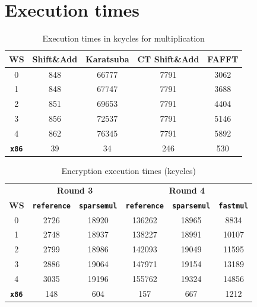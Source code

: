 \chapter{Execution times}

\begin{table}[H]
    \centering
    \caption{Execution times in kcycles for multiplication}
    \begin{tabular}{c|cccc}
        \toprule
        \textbf{WS}  & \textbf{Shift\&Add} & \textbf{Karatsuba} & \textbf{CT Shift\&Add} & \textbf{FAFFT} \\
        \midrule
        0 & 848 & 66777 & 7791 & 3062 \\
        1 & 848 & 67747 & 7791 & 3688 \\
        2 & 851 & 69653 & 7791 & 4404 \\
        3 & 856 & 72537 & 7791 & 5146 \\
        4 & 862 & 76345 & 7791 & 5892 \\
        \midrule
        \textbf{\texttt{x86}} & 39  &  34  &  246  &  530 \\
        \bottomrule
    \end{tabular}
    \label{tab:multTiming}
\end{table}

\begin{table}[H]
    \centering
    \caption{Encryption execution times (kcycles)}
    \begin{tabular}{c|cc|ccc}
        \toprule
        & \multicolumn{2}{c|}{\textbf{Round 3}} & \multicolumn{3}{c}{\textbf{Round 4}} \\
        \textbf{WS} & \texttt{\textbf{reference}} & \texttt{\textbf{sparsemul}} & \texttt{\textbf{reference}} & \texttt{\textbf{sparsemul}} & \texttt{\textbf{fastmul}} \\
        \midrule
        0 & 2726 & 18920 & 136262 & 18965 & 8834 \\
        1 & 2748 & 18937 & 138227 & 18991 & 10107 \\
        2 & 2799 & 18986 & 142093 & 19049 & 11595 \\
        3 & 2886 & 19064 & 147971 & 19154 & 13189 \\
        4 & 3035 & 19196 & 155762 & 19324 & 14856 \\
        \midrule
        \textbf{\texttt{x86}} & 148 & 604 & 157 & 667 & 1212 \\
        \bottomrule
    \end{tabular}
    \label{tab:encTiming}
\end{table}

